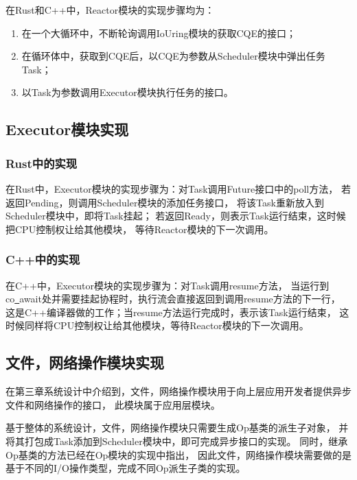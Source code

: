 \documentclass[supercite]{HustGraduPaper}
\theoremstyle{definition}
\begin{document}
在Rust和C++中，Reactor模块的实现步骤均为：

\begin{enumerate}
  \item 在一个大循环中，不断轮询调用IoUring模块的获取CQE的接口；
  \item 在循环体中，获取到CQE后，以CQE为参数从Scheduler模块中弹出任务Task；
  \item 以Task为参数调用Executor模块执行任务的接口。
\end{enumerate}

\subsection{Executor模块实现}

\subsubsection{Rust中的实现}

在Rust中，Executor模块的实现步骤为：对Task调用Future接口中的poll方法，
若返回Pending，则调用Scheduler模块的添加任务接口，
将该Task重新放入到Scheduler模块中，即将Task挂起；
若返回Ready，则表示Task运行结束，这时候把CPU控制权让给其他模块，
等待Reactor模块的下一次调用。\par

\subsubsection{C++中的实现}

在C++中，Executor模块的实现步骤为：对Task调用resume方法，
当运行到co\underline{~}await处并需要挂起协程时，执行流会直接返回到调用resume方法的下一行，
这是C++编译器做的工作；当resume方法运行完成时，表示该Task运行结束，
这时候同样将CPU控制权让给其他模块，等待Reactor模块的下一次调用。\par

\subsection{文件，网络操作模块实现}

在第三章系统设计中介绍到，文件，网络操作模块用于向上层应用开发者提供异步文件和网络操作的接口，
此模块属于应用层模块。\par

基于整体的系统设计，文件，网络操作模块只需要生成Op基类的派生子对象，
并将其打包成Task添加到Scheduler模块中，即可完成异步接口的实现。
同时，继承Op基类的方法已经在Op模块的实现中指出，
因此文件，网络操作模块需要做的是基于不同的I/O操作类型，完成不同Op派生子类的实现。\par
\end{document}
